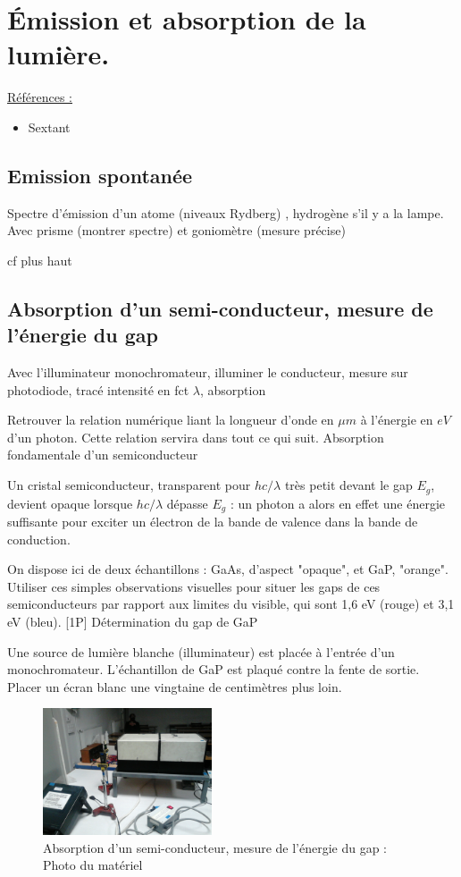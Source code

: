 \documentclass{article}%
\begin{document}
\section{Émission et absorption de la lumière.}
\underline{Références :}
\begin{itemize}
	\item Sextant
\end{itemize}

\subsection{Emission spontanée}

Spectre d'émission d'un atome (niveaux Rydberg) , hydrogène s'il y a la lampe.
Avec prisme (montrer spectre) et goniomètre (mesure précise)

cf plus haut
\subsection{Absorption d'un semi-conducteur, mesure de l'énergie du gap}
Avec l'illuminateur monochromateur, illuminer le conducteur, mesure sur photodiode, tracé intensité en fct $\lambda$, absorption

Retrouver la relation numérique liant la longueur d'onde en $\mu m$ à l'énergie en $eV$ d'un photon. Cette relation servira dans tout ce qui suit.
Absorption fondamentale d'un semiconducteur

Un cristal semiconducteur, transparent pour $hc/\lambda$ très petit devant le gap $E_g$, devient opaque lorsque $hc/\lambda$ dépasse $E_g$ : un photon a alors en effet une énergie suffisante pour exciter un électron de la bande de valence dans la bande de conduction.

On dispose ici de deux échantillons : GaAs, d'aspect "opaque", et GaP, "orange". Utiliser ces simples observations visuelles pour situer les gaps de ces semiconducteurs par rapport aux limites du visible, qui sont 1,6 eV (rouge) et 3,1 eV (bleu).
[1P] Détermination du gap de GaP

Une source de lumière blanche (illuminateur) est placée à l'entrée d'un monochromateur. L'échantillon de GaP est plaqué contre la fente de sortie. Placer un écran blanc une vingtaine de centimètres plus loin.
\begin{figure}
	\centerline{\includegraphics[width=5cm]{images-exp/gap_monochromateur.jpg}}
	\caption{Absorption d'un semi-conducteur, mesure de l'énergie du gap : Photo du matériel}
\end{figure}
\end{document}
